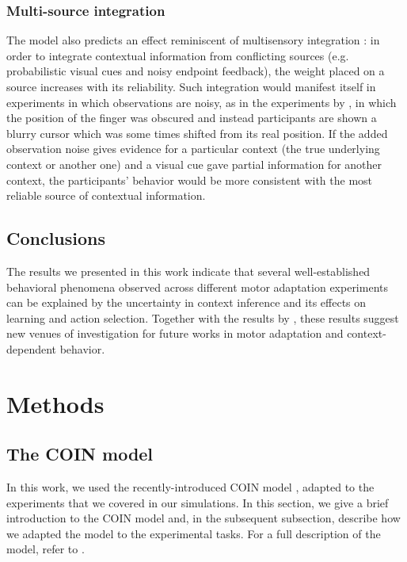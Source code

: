 \documentclass[a4paper,doc,floatsintext,natbib]{apa6}
\begin{document}
\subsubsection{Multi-source integration}
The model also predicts an effect reminiscent of multisensory integration \citep{Ernst_Humans_2002}: in order to integrate contextual information from conflicting sources (e.g. probabilistic visual cues and noisy endpoint feedback), the weight placed on a source increases with its reliability. Such integration would manifest itself in experiments in which observations are noisy, as in the experiments by \cite{Kording_Bayesian_2004}, in which the position of the finger was obscured and instead participants are shown a blurry cursor which was some times shifted from its real position. If the added observation noise gives evidence for a particular context (the true underlying context or another one) and a visual cue gave partial information for another context, the participants' behavior would be more consistent with the most reliable source of contextual information.

\subsection{Conclusions}
The results we presented in this work indicate that several well-established behavioral phenomena observed across different motor adaptation experiments can be explained by the uncertainty in context inference and its effects on learning and action selection. Together with the results by \cite{Heald_Contextual_2021}, these results suggest new venues of investigation for future works in motor adaptation and context-dependent behavior.


\section{Methods}
\subsection{The COIN model}
In this work, we used the recently-introduced COIN model \citep{Heald_Contextual_2021}, adapted to the experiments that we covered in our simulations. In this section, we give a brief introduction to the COIN model and, in the subsequent subsection, describe how we adapted the model to the experimental tasks. For a full description of the model, refer to \cite{Heald_Contextual_2021}.
\end{document}
